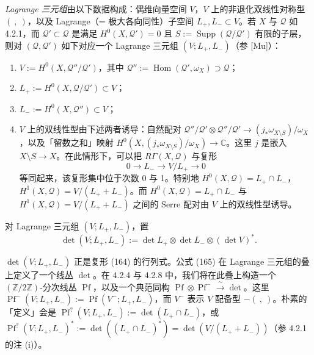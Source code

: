  \emph{Lagrange 三元组}由以下数据构成：偶维向量空间 $V$，$V$ 上的非退化双线性对称型 $(\ ,\ )$，以及 Lagrange（= 极大各向同性）子空间 $L_{+},L_{-}\subset V$。若 $X$ 与 $\mathcal{Q}$ 如 4.2.1，而 $\mathcal{Q}'\subset\mathcal{Q}$ 是满足 $H^{0}(X,\mathcal{Q}')=0$ 且 $S:=\operatorname{Supp}(\mathcal{Q}/\mathcal{Q}')$ 有限的子层，则对 $(\mathcal{Q},\mathcal{Q}')$ 如下对应一个 Lagrange 三元组 $(V;L_{+},L_{-})$（参 [Mu]）：
\begin{enumerate}[label=(\arabic*),leftmargin=2.2em]
\item $V:=H^{0}(X,\mathcal{Q}''/\mathcal{Q}')$，其中 $\mathcal{Q}'':=\operatorname{Hom}(\mathcal{Q}',\omega_{X})\supset\mathcal{Q}$；
\item $L_{+}:=H^{0}(X,\mathcal{Q}/\mathcal{Q}')\subset V$；
\item $L_{-}:=H^{0}(X,\mathcal{Q}'')\subset V$；
\item $V$ 上的双线性型由下述两者诱导：自然配对 $\mathcal{Q}''/\mathcal{Q}'\otimes\mathcal{Q}''/\mathcal{Q}'\to(j_{*}\omega_{X\setminus S})/\omega_{X}$，以及「留数之和」映射 $H^{0}(X,(j_{*}\omega_{X\setminus S})/\omega_{X})\to\mathbb{C}$。这里 $j$ 是嵌入 $X\setminus S\to X$。在此情形下，可以把 $R\Gamma(X,\mathcal{Q})$ 与复形
\begin{equation}\tag{164}
0\longrightarrow L_{-}\longrightarrow V/L_{+}\longrightarrow 0
\end{equation}
等同起来，该复形集中位于次数 0 与 1。特别地 $H^{0}(X,\mathcal{Q})=L_{+}\cap L_{-}$，$H^{1}(X,\mathcal{Q})=V/(L_{+}+L_{-})$。而 $H^{0}(X,\mathcal{Q})=L_{+}\cap L_{-}$ 与 $H^{1}(X,\mathcal{Q})=V/(L_{+}+L_{-})$ 之间的 Serre 配对由 $V$ 上的双线性型诱导。
\end{enumerate}

 对 Lagrange 三元组 $(V;L_{+},L_{-})$，置
\begin{equation}\tag{165}
\det(V;L_{+},L_{-}):=\det L_{+}\otimes\det L_{-}\otimes(\det V)^{*}.
\end{equation}

$\det(V;L_{+},L_{-})$ 正是复形 (164) 的行列式。公式 (165) 在 Lagrange 三元组的叠上定义了一个线丛 $\det$。在 4.2.4 与 4.2.8 中，我们将在此叠上构造一个 $(\mathbb{Z}/2\mathbb{Z})$-分次线丛 $\operatorname{Pf}$，以及一个典范同构 $\operatorname{Pf}\otimes\operatorname{Pf}^{-}\xrightarrow{\ \sim\ }\det$。这里 $\operatorname{Pf}^{-}(V;L_{+},L_{-}):=\operatorname{Pf}(V^{-};L_{+},L_{-})$，而 $V^{-}$ 表示 $V$ 配备型 $-(\ ,\ )$。朴素的「定义」会是 $\operatorname{Pf}^{?}(V;L_{+},L_{-}):=\det(L_{+}\cap L_{-})$，或 $\operatorname{Pf}^{?}(V;L_{+},L_{-})^{*}:=\det((L_{+}\cap L_{-})^{*})=\det(V/(L_{+}+L_{-}))$（参 4.2.1 的注 (i)）。


